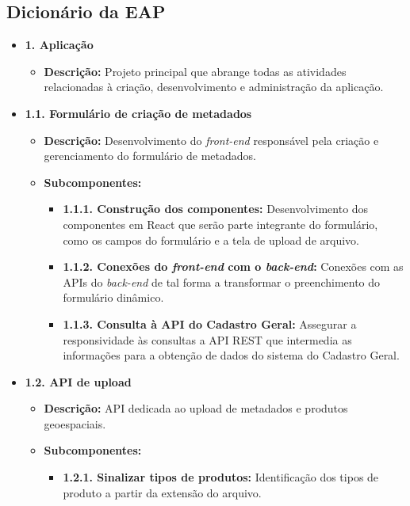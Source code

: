 \subsection{Dicionário da EAP}
\begin{itemize}
   \item \textbf{1. Aplicação}
    \begin{itemize}
        \item \textbf{Descrição:} Projeto principal que abrange todas as atividades relacionadas à criação, desenvolvimento e administração da aplicação.
    \end{itemize}

    \item \textbf{1.1. Formulário de criação de metadados}
    \begin{itemize}
        \item \textbf{Descrição:} Desenvolvimento do \textit{front-end} responsável pela criação e gerenciamento do formulário de metadados.
        \item \textbf{Subcomponentes:}
        \begin{itemize}
            \item \textbf{1.1.1. Construção dos componentes:} Desenvolvimento dos componentes em React que serão parte integrante do formulário, como os campos do formulário e a tela de upload de arquivo.
            \item \textbf{1.1.2. Conexões do \textit{front-end} com o \textit{back-end}:} Conexões com as APIs do \textit{back-end} de tal forma a transformar o preenchimento do formulário dinâmico.
            \item \textbf{1.1.3. Consulta à API do Cadastro Geral:} Assegurar a responsividade às consultas a API REST que intermedia as informações para a obtenção de dados do sistema do Cadastro Geral.
        \end{itemize}
    \end{itemize}

    \item \textbf{1.2. API de upload}
    \begin{itemize}
        \item \textbf{Descrição:} API dedicada ao upload de metadados e produtos geoespaciais.
        \item \textbf{Subcomponentes:}
        \begin{itemize}
            \item \textbf{1.2.1. Sinalizar tipos de produtos:} Identificação dos tipos de produto a partir da extensão do arquivo.
            

\end{itemize}
\end{itemize}
\end{itemize}
